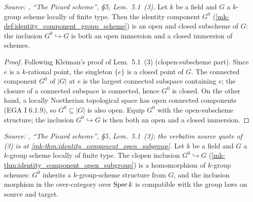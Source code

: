 \begin{theorem}
  \label{mk-thm:identity_component_open_subgroup}

  \textit{Source: \cite{kleiman-picard}, ``The Picard scheme'', \S 5, Lem.~5.1~(3).}
  Let \(k\) be a field and \(G\) a \(k\)-group scheme locally of finite
  type. Then the identity component \(G^0\)
  (\ref{mk-def:identity_component_group_scheme}) is an open and closed
  subscheme of \(G\): the inclusion \(G^0 \hookrightarrow G\) is both an
  open immersion and a closed immersion of schemes.
\end{theorem}
\begin{proof}
  Following Kleiman's proof of Lem.~5.1~(3) (clopen-subscheme part).
  Since \(e\) is a \(k\)-rational point, the singleton \(\{e\}\) is a closed
  point of \(G\). The connected component \(G^0\) of \(|G|\) at \(e\) is the
  largest connected subspace containing \(e\); the closure of a connected
  subspace is connected, hence \(G^0\) is closed. On the other hand, a
  locally Noetherian topological space has open connected components
  (EGA I 6.1.9), so \(G^0 \subseteq |G|\) is also open. Equip \(G^0\) with
  the open-subscheme structure; the inclusion
  \(G^0 \hookrightarrow G\) is then both an open and a closed immersion.
\end{proof}

\begin{theorem}\label{mk-thm:identity_component_is_subgroup_homomorphism}
  \leanok

  \textit{Source: \cite{kleiman-picard}, ``The Picard scheme'', \S 5,
  Lem.~5.1~(3); the verbatim source quote of (3) is at
  \ref{mk-thm:identity_component_open_subgroup}.}
  Let \(k\) be a field and \(G\) a \(k\)-group scheme locally of finite
  type. The clopen inclusion \(G^0 \hookrightarrow G\)
  (\ref{mk-thm:identity_component_open_subgroup}) is a homomorphism of
  \(k\)-group schemes: \(G^0\) inherits a \(k\)-group-scheme structure
  from \(G\), and the inclusion morphism in the over-category over
  \(\operatorname{Spec} k\) is compatible with the group laws on source and target.
\end{theorem}

